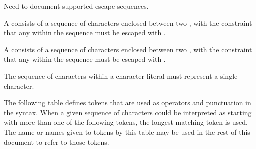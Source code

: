 
\begin{Incomplete}
Need to document supported escape sequences.
\end{Incomplete}


A  consists of a sequence of characters enclosed between two , with the constraint that any  within the sequence must be escaped with \Char{\\}.


A  consists of a sequence of characters enclosed between two , with the constraint that any  within the sequence must be escaped with \Char{\\}.

The sequence of characters within a character literal must represent a single character.


The following table defines tokens that are used as operators and punctuation in the syntax.
When a given sequence of characters could be interpreted as starting with more than one of the following tokens, the longest matching token is used.
The name or names given to tokens by this table may be used in the rest of this document to refer to those tokens.

